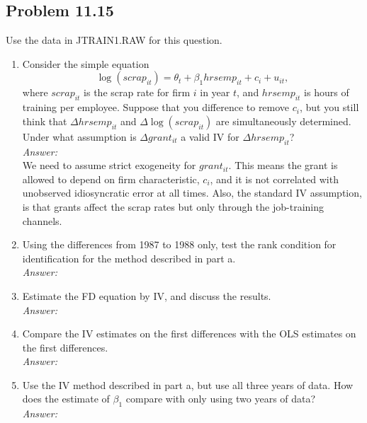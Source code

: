 \documentclass[10pt]{article}
\begin{document}
\subsection*{Problem 11.15}
Use the data in JTRAIN1.RAW for this question.
\begin{enumerate}[label=\alph*.]
\item Consider the simple equation \[\log(scrap_{it})=\theta_t+\beta_1hrsemp_{it}+c_i+u_{it},\] where $scrap_{it}$ is the scrap rate for firm $i$ in year $t$, and $hrsemp_{it}$ is hours of training per employee. Suppose that you difference to remove $c_i$, but you still think that $\Delta hrsemp_{it}$ and $\Delta \log(scrap_{it})$ are simultaneously determined. Under what assumption is $\Delta grant_{it}$ a valid IV for $\Delta hrsemp_{it}$?
\\ \textit{Answer:}\\
We need to assume strict exogeneity for $grant_{it}.$ This means the grant is allowed to depend on firm characteristic, $c_i$, and it is not correlated with unobserved idiosyncratic error at all times. Also, the standard IV assumption, is that grants affect the scrap rates but only through the job-training channels.

\item Using the differences from 1987 to 1988 only, test the rank condition for identification for the method described in part a.
\\ \textit{Answer:}\\

\item Estimate the FD equation by IV, and discuss the results.
\\\textit{Answer:}\\

\item Compare the IV estimates on the first differences with the OLS estimates on the first differences.
\\\textit{Answer:}\\

\item Use the IV method described in part a, but use all three years of data. How does the estimate of $\beta_1$ compare with only using two years of data? 
\\\textit{Answer:}\\

\end{enumerate}
\end{document}
